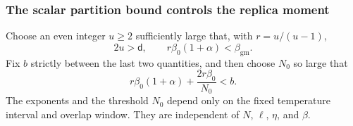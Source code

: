\documentclass[11pt,reqno]{amsart}
\numberwithin{equation}{section}
\theoremstyle{plain}
\theoremstyle{definition}
\renewcommand{\d}{\mathsf d}
\newcommand{\be}{\beta}
\newcommand{\gm}{\mathrm{gm}}
\begin{document}
\subsubsection{The scalar partition bound controls the replica moment}
Choose an even integer $u\geq2$ sufficiently large that, with $r=u/(u-1)$,
\begin{equation}\label{eq:r-choice}
 2u>\d,\qquad r\be_0(1+\alpha)<\beta_{\gm}.
\end{equation}
Fix $b$ strictly between the last two quantities, and then choose $N_0$ so large that
\begin{equation}\label{eq:ceiling-buffer}
 r\be_0(1+\alpha)+\frac{2r\be_0}{N_0}<b.
\end{equation}
The exponents and the threshold $N_0$ depend only on the fixed temperature interval and overlap window. They are independent of $N$, $\ell$, $\eta$, and $\be$.
\end{document}
